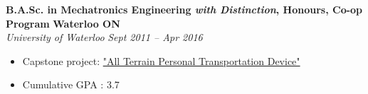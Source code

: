     \textbf{B.A.Sc. in Mechatronics Engineering \emph{with Distinction}, Honours, Co-op Program }
    \hfill
    \textbf{Waterloo ON}\\
    \textit{University of Waterloo}
    \hfill
    \textit{Sept 2011 -- Apr 2016}
    \begin{itemize}
        \item Capstone project: \href{https://youtu.be/OwfrKlr_Zhk}{"All Terrain Personal Transportation Device"}
        \item Cumulative GPA : 3.7
    \end{itemize}

